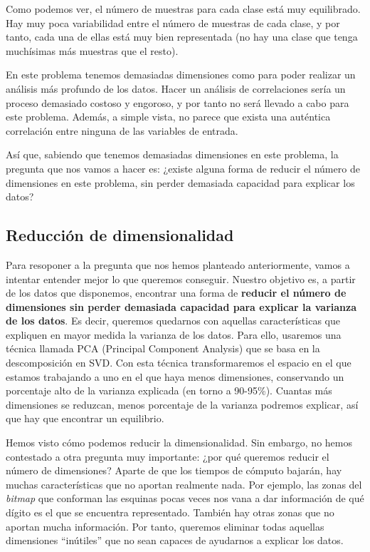\documentclass[11pt,a4paper]{article}
\begin{document}
    Como podemos ver, el número de muestras para cada clase está muy
equilibrado. Hay muy poca variabilidad entre el número de muestras de
cada clase, y por tanto, cada una de ellas está muy bien representada
(no hay una clase que tenga muchísimas más muestras que el resto).

En este problema tenemos demasiadas dimensiones como para poder realizar
un análisis más profundo de los datos. Hacer un análisis de
correlaciones sería un proceso demasiado costoso y engoroso, y por tanto
no será llevado a cabo para este problema. Además, a simple vista, no
parece que exista una auténtica correlación entre ninguna de las
variables de entrada.

Así que, sabiendo que tenemos demasiadas dimensiones en este problema,
la pregunta que nos vamos a hacer es: ¿existe alguna forma de reducir el
número de dimensiones en este problema, sin perder demasiada capacidad
para explicar los datos?

    \subsection{Reducción de
dimensionalidad}\label{reducciuxf3n-de-dimensionalidad}

Para resoponer a la pregunta que nos hemos planteado anteriormente,
vamos a intentar entender mejor lo que queremos conseguir. Nuestro
objetivo es, a partir de los datos que disponemos, encontrar una forma
de \textbf{reducir el número de dimensiones sin perder demasiada
capacidad para explicar la varianza de los datos}. Es decir, queremos
quedarnos con aquellas características que expliquen en mayor medida la
varianza de los datos. Para ello, usaremos una técnica llamada PCA
(Principal Component Analysis) que se basa en la descomposición en SVD.
Con esta técnica transformaremos el espacio en el que estamos trabajando
a uno en el que haya menos dimensiones, conservando un porcentaje alto
de la varianza explicada (en torno a 90-95\%). Cuantas más dimensiones
se reduzcan, menos porcentaje de la varianza podremos explicar, así que
hay que encontrar un equilibrio.

Hemos visto cómo podemos reducir la dimensionalidad. Sin embargo, no
hemos contestado a otra pregunta muy importante: ¿por qué queremos
reducir el número de dimensiones? Aparte de que los tiempos de cómputo
bajarán, hay muchas características que no aportan realmente nada. Por
ejemplo, las zonas del \emph{bitmap} que conforman las esquinas pocas
veces nos vana a dar información de qué dígito es el que se encuentra
representado. También hay otras zonas que no aportan mucha información.
Por tanto, queremos eliminar todas aquellas dimensiones ``inútiles'' que
no sean capaces de ayudarnos a explicar los datos.
\end{document}
